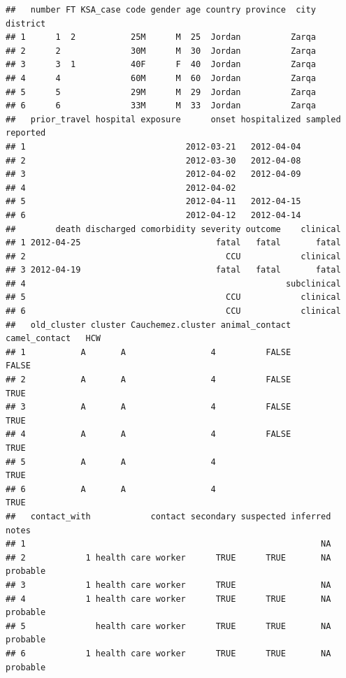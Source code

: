 \documentclass[]{article}
\begin{document}
\begin{verbatim}
##   number FT KSA_case code gender age country province  city district
## 1      1  2           25M      M  25  Jordan          Zarqa         
## 2      2              30M      M  30  Jordan          Zarqa         
## 3      3  1           40F      F  40  Jordan          Zarqa         
## 4      4              60M      M  60  Jordan          Zarqa         
## 5      5              29M      M  29  Jordan          Zarqa         
## 6      6              33M      M  33  Jordan          Zarqa         
##   prior_travel hospital exposure      onset hospitalized sampled reported
## 1                                2012-03-21   2012-04-04                 
## 2                                2012-03-30   2012-04-08                 
## 3                                2012-04-02   2012-04-09                 
## 4                                2012-04-02                              
## 5                                2012-04-11   2012-04-15                 
## 6                                2012-04-12   2012-04-14                 
##        death discharged comorbidity severity outcome    clinical
## 1 2012-04-25                           fatal   fatal       fatal
## 2                                        CCU            clinical
## 3 2012-04-19                           fatal   fatal       fatal
## 4                                                    subclinical
## 5                                        CCU            clinical
## 6                                        CCU            clinical
##   old_cluster cluster Cauchemez.cluster animal_contact camel_contact   HCW
## 1           A       A                 4          FALSE               FALSE
## 2           A       A                 4          FALSE                TRUE
## 3           A       A                 4          FALSE                TRUE
## 4           A       A                 4          FALSE                TRUE
## 5           A       A                 4                               TRUE
## 6           A       A                 4                               TRUE
##   contact_with            contact secondary suspected inferred    notes
## 1                                                           NA         
## 2            1 health care worker      TRUE      TRUE       NA probable
## 3            1 health care worker      TRUE                 NA         
## 4            1 health care worker      TRUE      TRUE       NA probable
## 5              health care worker      TRUE      TRUE       NA probable
## 6            1 health care worker      TRUE      TRUE       NA probable

\end{verbatim}
\end{document}

